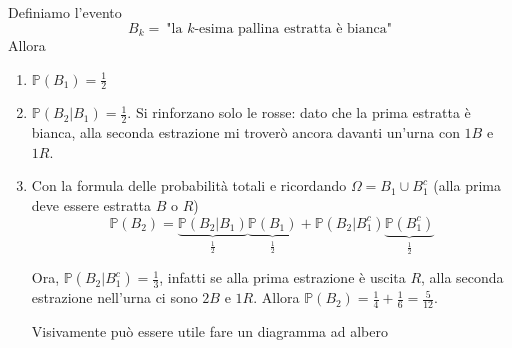Definiamo l'evento
\begin{equation*}
B_{k} =\ \text{"la } k\text{-esima pallina estratta è bianca"}
\end{equation*}
Allora
\begin{enumerate}
\item $\mathbb{P}( B_{1}) =\frac{1}{2}$
\item $\mathbb{P}( B_{2} |B_{1}) =\frac{1}{2}$. Si rinforzano solo le rosse: dato che la prima estratta è bianca, alla seconda estrazione mi troverò ancora davanti un'urna con $1B$ e $1R$.
\item Con la formula delle probabilità totali e ricordando $\Omega =B_{1} \cup B_{1}^{c}$ (alla prima deve essere estratta $B$ o $R$)\begin{equation*}
\mathbb{P}( B_{2}) =\underbrace{\mathbb{P}( B_{2} |B_{1})}_{\frac{1}{2}}\underbrace{\mathbb{P}( B_{1})}_{\frac{1}{2}} +\mathbb{P}\left( B_{2} |B_{1}^{c}\right)\underbrace{\mathbb{P}\left( B_{1}^{c}\right)}_{\frac{1}{2}}
\end{equation*}

Ora, $\mathbb{P}\left( B_{2} |B_{1}^{c}\right) =\frac{1}{3}$, infatti se alla prima estrazione è uscita $R$, alla seconda estrazione nell'urna ci sono $2B$ e $1R$. Allora $\mathbb{P}( B_{2}) =\frac{1}{4} +\frac{1}{6} =\frac{5}{12}$.

Visivamente può essere utile fare un diagramma ad albero


\end{enumerate}

